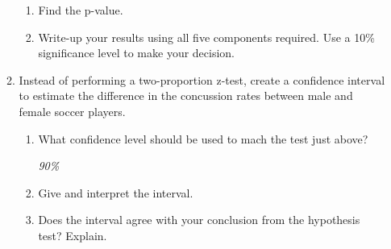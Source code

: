 \begin{enumerate}
\begin{enumerate}
\begin{enumerate}
           \item  Find the p-value.
\begin{students}
          \vspace{1cm}
\end{students}
\begin{key}
 {\it  }      
\end{key}

           \item  Write-up your results using all five components
             required.  Use a 10\% significance level to make your
             decision.  
\begin{students}
          \vspace{2cm}
\end{students}
\begin{key}
 {\it  }      
\end{key}
\end{enumerate}

         \item  Instead of performing a two-proportion z-test, create
           a confidence interval to estimate the difference
           in the concussion rates between male and female soccer
           players.
           \begin{enumerate}
           \item  What confidence level should be used to mach the
             test just above? 
\begin{students}
          \vspace{1cm}
\end{students}
\begin{key}
 {\it 90\% }      
\end{key}
           \item  Give and interpret the interval.
\begin{students}
          \vspace{3cm}
\end{students}
\begin{key}
 {\it  }      
\end{key}

           \item  Does the interval agree with your conclusion from
             the hypothesis test?  Explain. 
\begin{students}
          \vspace{2cm}
\end{students}
\begin{key}
 {\it  }      
\end{key}


\end{enumerate}
\end{enumerate}
\end{enumerate}
